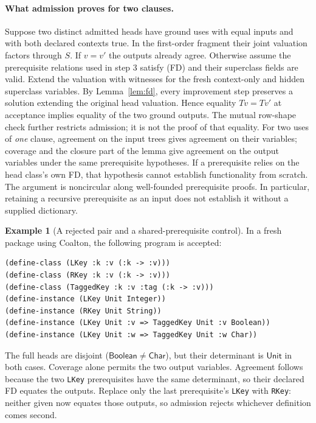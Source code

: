 \documentclass[11pt]{article}
\theoremstyle{definition}
\newtheorem{example}[theorem]{Example}
\newcommand{\code}[1]{\texttt{#1}}
\newcommand{\Bool}{\mathsf{Boolean}}
\newcommand{\Unit}{\mathsf{Unit}}
\begin{document}
\paragraph{What admission proves for two clauses.}
Suppose two distinct admitted heads have ground uses with equal inputs
and with both declared contexts true. In the first-order fragment their
joint valuation factors through $S$. If $v=v'$ the outputs already agree.
Otherwise assume the prerequisite relations used in step 3 satisfy (FD)
and their superclass fields are valid. Extend the valuation with witnesses
for the fresh context-only and hidden superclass variables. By
Lemma~\ref{lem:fd}, every improvement step preserves a solution extending
the original head valuation. Hence equality
$Tv=Tv'$ at acceptance implies equality of the two ground outputs.
The mutual row-shape check further restricts admission; it is not the
proof of that equality. For two uses of \emph{one} clause, agreement on
the input trees gives agreement on their variables; coverage and the
closure part of the lemma give agreement on the output variables under
the same prerequisite hypotheses. If a prerequisite relies on the head
class's own FD, that hypothesis cannot establish functionality from
scratch. The argument is noncircular along well-founded prerequisite
proofs. In particular, retaining a recursive prerequisite as an input
does not establish it without a supplied dictionary.

\begin{example}[A rejected pair and a shared-prerequisite control]\label{ex:fd}
In a fresh package using Coalton, the following program is accepted:
\begin{verbatim}
(define-class (LKey :k :v (:k -> :v)))
(define-class (RKey :k :v (:k -> :v)))
(define-class (TaggedKey :k :v :tag (:k -> :v)))
(define-instance (LKey Unit Integer))
(define-instance (RKey Unit String))
(define-instance (LKey Unit :v => TaggedKey Unit :v Boolean))
(define-instance (LKey Unit :w => TaggedKey Unit :w Char))
\end{verbatim}
The full heads are disjoint ($\Bool\ne\mathsf{Char}$), but their determinant
is $\Unit$ in both cases. Coverage alone permits the two output variables.
Agreement follows because the two \code{LKey} prerequisites have the same
determinant, so their declared FD equates the outputs. Replace only the
last prerequisite's \code{LKey} with \code{RKey}: neither given now equates
those outputs, so admission rejects whichever definition comes second.
\end{example}
\end{document}
